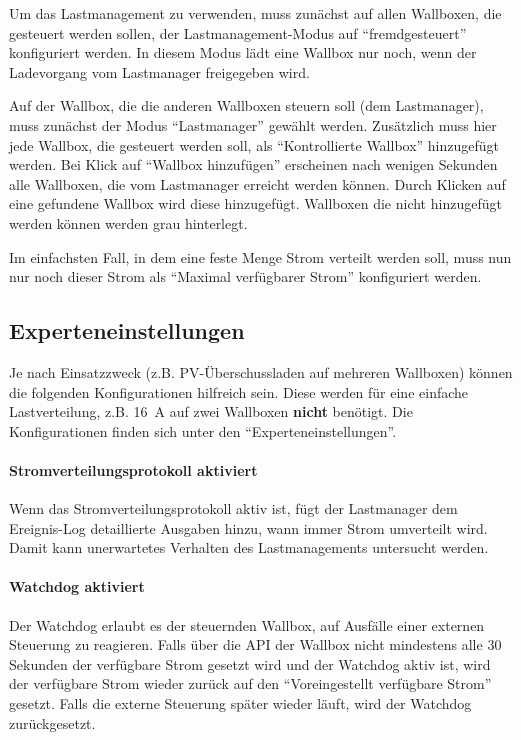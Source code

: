 \documentclass[a4paper,10pt]{article}
\begin{document}
\begin{multicols*}{2}
    Um das Lastmanagement zu verwenden, muss zunächst auf allen Wallboxen, die gesteuert werden sollen,
    der Lastmanagement-Modus auf \enquote{fremdgesteuert} konfiguriert werden.
    In diesem Modus lädt eine Wallbox nur noch, wenn der Ladevorgang vom Lastmanager freigegeben wird.

    Auf der Wallbox, die die anderen Wallboxen steuern soll (dem Lastmanager), muss zunächst der Modus \enquote{Lastmanager} gewählt werden.
    Zusätzlich muss hier jede Wallbox, die gesteuert werden soll, als \enquote{Kontrollierte Wallbox} hinzugefügt werden.
    Bei Klick auf \enquote{Wallbox hinzufügen} erscheinen nach wenigen Sekunden alle Wallboxen, die vom Lastmanager erreicht werden können.
    Durch Klicken auf eine gefundene Wallbox wird diese hinzugefügt. Wallboxen die nicht hinzugefügt werden können werden grau hinterlegt.

    Im einfachsten Fall, in dem eine feste Menge Strom verteilt werden soll, muss nun nur noch dieser
    Strom als \enquote{Maximal verfügbarer Strom} konfiguriert werden.

    \vspace{-0.2cm}
    \subsection{Experteneinstellungen}
    \vspace{-0.1cm}
    Je nach Einsatzzweck (z.B. PV-Überschussladen auf mehreren Wallboxen) können die folgenden Konfigurationen hilfreich sein.
    Diese werden für eine einfache Lastverteilung, z.B. \SI{16}{\ampere} auf zwei Wallboxen \textbf{nicht} benötigt.
    Die Konfigurationen finden sich unter den \enquote{Experteneinstellungen}.

    \vspace{-0.2cm}
    \paragraph{Stromverteilungsprotokoll aktiviert}
    Wenn das Stromverteilungsprotokoll aktiv ist, fügt der Lastmanager dem Ereignis-Log detaillierte Ausgaben hinzu, wann immer Strom umverteilt wird. Damit kann unerwartetes Verhalten des
    Lastmanagements untersucht werden.

    \vspace{-0.2cm}
    \paragraph{Watchdog aktiviert}
    Der Watchdog erlaubt es der steuernden Wallbox, auf Ausfälle einer externen Steuerung zu reagieren. Falls über die API der Wallbox
    nicht mindestens alle 30 Sekunden der verfügbare Strom gesetzt wird und der Watchdog aktiv ist, wird der verfügbare Strom wieder zurück auf den
    \enquote{Voreingestellt verfügbare Strom} gesetzt. Falls die externe Steuerung später wieder läuft, wird der Watchdog zurückgesetzt.


\end{multicols*}
\end{document}
